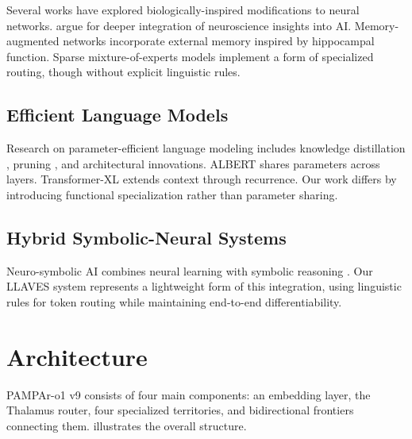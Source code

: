 \documentclass[11pt,a4paper]{article}
\begin{document}
Several works have explored biologically-inspired modifications to neural networks. \citet{hassabis2017neuroscience} argue for deeper integration of neuroscience insights into AI. Memory-augmented networks \citep{graves2016hybrid} incorporate external memory inspired by hippocampal function. Sparse mixture-of-experts models \citep{shazeer2017outrageously} implement a form of specialized routing, though without explicit linguistic rules.

\subsection{Efficient Language Models}

Research on parameter-efficient language modeling includes knowledge distillation \citep{hinton2015distilling}, pruning \citep{han2015learning}, and architectural innovations. ALBERT \citep{lan2019albert} shares parameters across layers. Transformer-XL \citep{dai2019transformer} extends context through recurrence. Our work differs by introducing functional specialization rather than parameter sharing.

\subsection{Hybrid Symbolic-Neural Systems}

Neuro-symbolic AI combines neural learning with symbolic reasoning \citep{garcez2019neural}. Our LLAVES system represents a lightweight form of this integration, using linguistic rules for token routing while maintaining end-to-end differentiability.

\section{Architecture}
\label{sec:architecture}

PAMPAr-o1 v9 consists of four main components: an embedding layer, the Thalamus router, four specialized territories, and bidirectional frontiers connecting them.  illustrates the overall structure.
\end{document}
